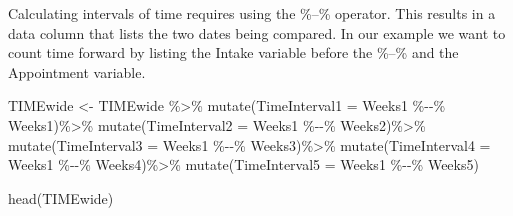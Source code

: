 \documentclass[
  english,
]{book}
\newenvironment{Shaded}{\begin{snugshade}}{\end{snugshade}}
\newcommand{\AttributeTok}[1]{\textcolor[rgb]{0.77,0.63,0.00}{#1}}
\newcommand{\FunctionTok}[1]{\textcolor[rgb]{0.00,0.00,0.00}{#1}}
\newcommand{\NormalTok}[1]{#1}
\newcommand{\OtherTok}[1]{\textcolor[rgb]{0.56,0.35,0.01}{#1}}
\newcommand{\SpecialCharTok}[1]{\textcolor[rgb]{0.00,0.00,0.00}{#1}}
\begin{document}
Calculating intervals of time requires using the \%--\% operator. This results in a data column that lists the two dates being compared. In our example we want to count time forward by listing the Intake variable before the \%--\% and the Appointment variable.

\begin{Shaded}
\begin{Highlighting}[]
\NormalTok{TIMEwide }\OtherTok{\textless{}{-}}\NormalTok{ TIMEwide }\SpecialCharTok{\%\textgreater{}\%}
  \FunctionTok{mutate}\NormalTok{(}\AttributeTok{TimeInterval1 =}\NormalTok{ Weeks1 }\SpecialCharTok{\%{-}{-}\%}\NormalTok{ Weeks1)}\SpecialCharTok{\%\textgreater{}\%}
  \FunctionTok{mutate}\NormalTok{(}\AttributeTok{TimeInterval2 =}\NormalTok{ Weeks1 }\SpecialCharTok{\%{-}{-}\%}\NormalTok{ Weeks2)}\SpecialCharTok{\%\textgreater{}\%}
  \FunctionTok{mutate}\NormalTok{(}\AttributeTok{TimeInterval3 =}\NormalTok{ Weeks1 }\SpecialCharTok{\%{-}{-}\%}\NormalTok{ Weeks3)}\SpecialCharTok{\%\textgreater{}\%}
  \FunctionTok{mutate}\NormalTok{(}\AttributeTok{TimeInterval4 =}\NormalTok{ Weeks1 }\SpecialCharTok{\%{-}{-}\%}\NormalTok{ Weeks4)}\SpecialCharTok{\%\textgreater{}\%}
  \FunctionTok{mutate}\NormalTok{(}\AttributeTok{TimeInterval5 =}\NormalTok{ Weeks1 }\SpecialCharTok{\%{-}{-}\%}\NormalTok{ Weeks5)}

\FunctionTok{head}\NormalTok{(TIMEwide)}
\end{Highlighting}
\end{Shaded}
\end{document}
